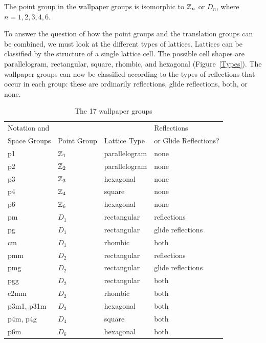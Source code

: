  
 
\begin{theorem}
The point group in the wallpaper groups is isomorphic to ${\Bbb Z}_n$
or $D_n$, where $n = 1, 2, 3, 4, 6$. 
\end{theorem}
 
 
To answer the question of how the point groups and the translation
groups can be combined, we must look at the different types of
lattices. Lattices can be classified by the structure of a single
lattice cell. The possible cell shapes are parallelogram, rectangular,
square, rhombic, and hexagonal (Figure~\ref{Types}). The wallpaper
groups can now be classified according to the types of reflections
that occur in each group: these are ordinarily reflections, glide
reflections, both, or none.
 
 
 
\begin{table}[htb]
\caption{The 17 wallpaper groups}{\small
\begin{center}
\begin{tabular}{|l|l|l|l|}
\hline
Notation and &             &              & Reflections  \\
Space Groups & Point Group & Lattice Type & or Glide Reflections? \\
\hline
p1 & ${\Bbb Z}_1$ & parallelogram & none \\
p2 & ${\Bbb Z}_2$ & parallelogram & none \\
p3 & ${\Bbb Z}_3$ & hexagonal & none \\
p4 & ${\Bbb Z}_4$ & square & none \\
p6 & ${\Bbb Z}_6$ & hexagonal & none \\
pm & $D_1$ & rectangular & reflections \\
pg & $D_1$ & rectangular & glide reflections\\
cm & $D_1$ & rhombic & both \\
pmm & $D_2$ & rectangular & reflections \\
pmg & $D_2$ & rectangular & glide reflections \\
pgg & $D_2$ & rectangular & both \\
c2mm & $D_2$ & rhombic & both \\
p3m1, p31m & $D_3$ & hexagonal & both \\
p4m, p4g & $D_4$ & square & both \\
p6m & $D_6$ & hexagonal & both \\
\hline
\end{tabular}
\end{center}
}
\end{table}
 
